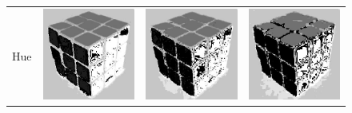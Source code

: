 \begin{figure}
\begin{tabular}{rccc}
         Hue &
         \includegraphics[width=\rubiklength]{img/rubik/1_hsv_h.jpg} & 
         \includegraphics[width=\rubiklength]{img/rubik/2_hsv_h.jpg} & \includegraphics[width=\rubiklength]{img/rubik/3_hsv_h.jpg}\\
         

\end{tabular}
\end{figure}
